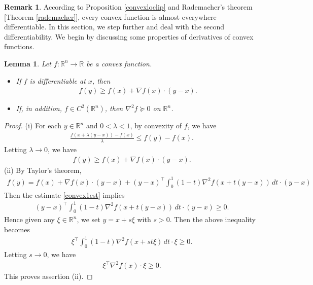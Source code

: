 \documentclass{article}
\numberwithin{equation}{section}
\newcommand{\bbR}{\mathbb{R}}
\theoremstyle{plain}
\newtheorem{lemma}[theorem]{Lemma}
\theoremstyle{definition}
\newtheorem*{remark}{Remark}
\begin{document}
\begin{remark}
According to Proposition \ref{convexloclip} and Rademacher's theorem [Theorem \ref{rademacher}], every convex function is almost everywhere differentiable. In this section, we step further and deal with the second differentiability. We begin by discussing some properties of derivatives of convex functions.
\end{remark}

\begin{lemma}
Let $f:\bbR^n\to\bbR$ be a convex function.
\begin{itemize}
	\item[(i)] If $f$ is differentiable at $x$, then
	\begin{align}
		f(y)\geq f(x)+\nabla f(x)\cdot (y-x).\label{convex1est}
	\end{align}
	\item[(ii)] If, in addition, $f\in C^2(\bbR^n)$, then $\nabla^2 f\succeq 0$ on $\bbR^n$.
\end{itemize}
\end{lemma}
\begin{proof}
(i) For each $y\in\bbR^n$ and $0<\lambda<1$, by convexity of $f$, we have
\begin{align*}
	\frac{f(x+\lambda(y-x))-f(x)}{\lambda}\leq f(y)-f(x).
\end{align*}
Letting $\lambda\to 0$, we have
\begin{align*}
	f(y)\geq f(x)+\nabla f(x)\cdot (y-x).
\end{align*}
(ii) By Taylor's theorem,
\begin{align*}
	f(y)=f(x)+\nabla f(x)\cdot (y-x)+(y-x)^\top\int_0^1(1-t)\nabla^2 f(x+t(y-x))\,dt\cdot (y-x)
\end{align*}
Then the estimate \ref{convex1est} implies
\begin{align*}
(y-x)^\top\int_0^1(1-t)\nabla^2 f(x+t(y-x))\,dt\cdot (y-x)\geq 0.
\end{align*}
Hence given any $\xi\in\bbR^n$, we set $y=x+s\xi$ with $s>0$. Then the above inequality becomes
\begin{align*}
	\xi^\top\int_0^1(1-t)\nabla^2 f(x+st\xi)\,dt\cdot\xi\geq 0.
\end{align*}
Letting $s\to 0$, we have
\begin{align*}
	\xi^\top\nabla^2 f(x)\cdot\xi\geq 0.
\end{align*}
This proves assertion (ii). 
\end{proof}
\end{document}
